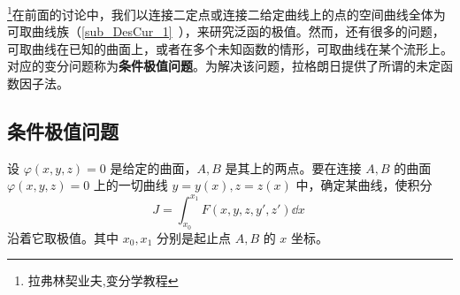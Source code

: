 
\footnote{拉弗林契业夫,变分学教程}在前面的讨论中，我们以连接二定点或连接二给定曲线上的点的空间曲线全体为可取曲线族（\autoref{sub_DesCur_1}~），来研究泛函的极值。然而，还有很多的问题，可取曲线在已知的曲面上，或者在多个未知函数的情形，可取曲线在某个流形上。对应的变分问题称为\textbf{条件极值问题}。为解决该问题，拉格朗日提供了所谓的未定函数因子法。
\subsection{条件极值问题}
设 $\varphi(x,y,z)=0$ 是给定的曲面，$A,B$ 是其上的两点。要在连接 $A,B$ 的曲面$\varphi(x,y,z)=0$ 上的一切曲线 $y=y(x),z=z(x)$ 中，确定某曲线，使积分
\begin{equation}\label{eq_CPLM_1}
J=\int_{x_0}^{x_1}F(x,y,z,y',z')\dd x~
\end{equation}
沿着它取极值。其中 $x_0,x_1$ 分别是起止点 $A,B$ 的 $x$ 坐标。
